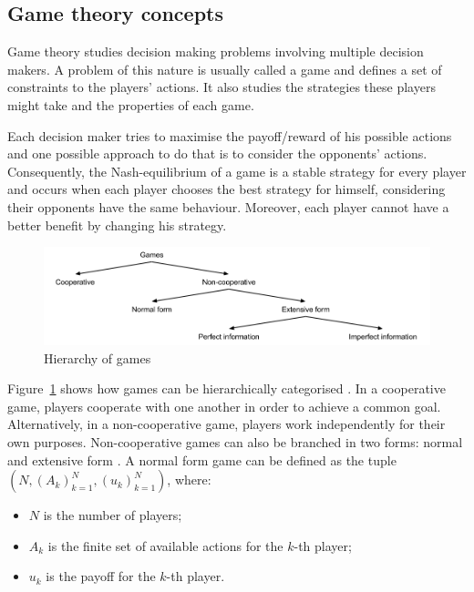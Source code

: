 \subsection{Game theory concepts}

Game theory studies decision making problems involving multiple decision makers.
A problem of this nature is usually called a game and defines a set of constraints to the players' actions.
It also studies the strategies these players might take and the properties of each game.

Each decision maker tries to maximise the payoff/reward of his possible actions and one possible approach to do that is to consider the opponents' actions.
Consequently, the Nash-equilibrium \cite{Nash1950} of a game is a stable strategy for every player and occurs when each player chooses the best strategy for himself, considering their opponents have the same behaviour.
Moreover, each player cannot have a better benefit by changing his strategy.

\begin{figure}
\centering
\includegraphics[width=1\textwidth]{./img/gamesHierarchy}
\caption{Hierarchy of games}
\label{fig:games}
\end{figure}

Figure~\ref{fig:games} shows how games can be hierarchically categorised \cite{Osborne2011}.
In a cooperative game, players cooperate with one another in order to achieve a common goal.
Alternatively, in a non-cooperative game, players work independently for their own purposes.
Non-cooperative games can also be branched in two forms: normal and extensive form \cite{Shoham2010}.
A normal form game can be defined as the tuple $(N,(A_k)_{k=1}^{N},(u_k)_{k=1}^{N})$, where:

\begin{itemize}
\item $N$ is the number of players;
\item $A_k$ is the finite set of available actions for the $k$-th player;
\item $u_k$ is the payoff for the $k$-th player.
\end{itemize}

